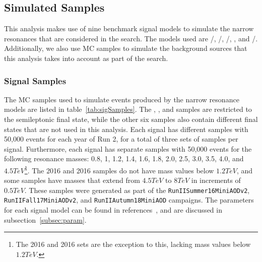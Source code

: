 
\subsection{Simulated Samples}
\label{sec:simSamples}

This analysis makes use of nine benchmark signal models to simulate the narrow resonances that are considered in the search.
The models used are \ggF/\VBF\GBulktoWWtolnuqqbarpr, \ggF/\VBF\RadtoWWtolnuqqbarpr, \DY/\VBF\WprtoWZtolnuqqbar, \DY\WprtoWHtolnubbbar, and \DY/\VBF\ZprtoWWtolnuqqbarpr.
Additionally, we also use MC samples to simulate the background sources that this analysis takes into account as part of the search.

\subsubsection{Signal Samples}

The MC samples used to simulate events produced by the narrow resonance models are listed in table~\ref{tab:sigSamples}.
The \DY\WprtoWH, \DY\WprtoWZ, and \ggF\GBulktoWW samples are restricted to the semileptonic final state, while the other six samples also contain different final states that are not used in this analysis.
Each signal has different samples with 50,000 events for each year of Run 2, for a total of three sets of samples per signal.
Furthermore, each signal has separate samples with 50,000 events for the following resonance masses: 0.8, 1, 1.2, 1.4, 1.6, 1.8, 2.0, 2.5, 3.0, 3.5, 4.0, and $4.5\unit{TeV}$\footnote{The 2016 \VBF\ZprtoWW and 2016 \VBF\WprtoWZ sets are the exception to this, lacking mass values below $1.2\unit{TeV}$.}.
The 2016 \VBF\ZprtoWW and 2016 \VBF\WprtoWZ samples do not have mass values below $1.2\unit{TeV}$, and some samples have masses that extend from $4.5\unit{TeV}$ to $8\unit{TeV}$ in increments of $0.5\unit{TeV}$.
These samples were generated as part of the \texttt{RunIISummer16MiniAODv2}, \texttt{RunIIFall17MiniAODv2}, and \texttt{RunIIAutumn18MiniAOD} campaigns.
The parameters for each signal model can be found in references~\cite{git:BulkGrav_WW,git:Wpr_WZ,git:Wpr_WH,git:VBFRad_WW}, and are discussed in subsection~\ref{subsec:param}.

